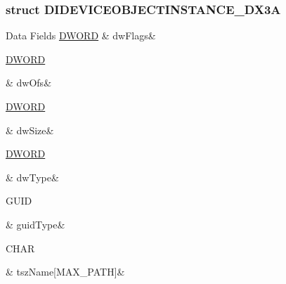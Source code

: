 \subsubsection{struct D\-I\-D\-E\-V\-I\-C\-E\-O\-B\-J\-E\-C\-T\-I\-N\-S\-T\-A\-N\-C\-E\-\_\-\-D\-X3\-A}
\begin{DoxyFields}{Data Fields}
\hypertarget{a00003_a4d2f405b1141000eb2af256e0fc8b98b}{\hyperlink{a00003_a50e15ae51c87ae06ab29c8148cb5f36c}{D\-W\-O\-R\-D}}\label{a00003_a4d2f405b1141000eb2af256e0fc8b98b}
&
dw\-Flags&
\\
\hline

\hypertarget{a00003_a2f0da10f0bff2a910138cc1b5715cdd5}{\hyperlink{a00003_a50e15ae51c87ae06ab29c8148cb5f36c}{D\-W\-O\-R\-D}}\label{a00003_a2f0da10f0bff2a910138cc1b5715cdd5}
&
dw\-Ofs&
\\
\hline

\hypertarget{a00003_a669c5a85f5a9eb97e64ad880fadaaa2d}{\hyperlink{a00003_a50e15ae51c87ae06ab29c8148cb5f36c}{D\-W\-O\-R\-D}}\label{a00003_a669c5a85f5a9eb97e64ad880fadaaa2d}
&
dw\-Size&
\\
\hline

\hypertarget{a00003_a81f5eff8d90c90eabc4c9a97d3ea7142}{\hyperlink{a00003_a50e15ae51c87ae06ab29c8148cb5f36c}{D\-W\-O\-R\-D}}\label{a00003_a81f5eff8d90c90eabc4c9a97d3ea7142}
&
dw\-Type&
\\
\hline

\hypertarget{a00003_aea5d3a608916b9ac856b773042e5051a}{G\-U\-I\-D}\label{a00003_aea5d3a608916b9ac856b773042e5051a}
&
guid\-Type&
\\
\hline

\hypertarget{a00003_a4b0a3dc31e4378c7de85eaa6654bcabb}{C\-H\-A\-R}\label{a00003_a4b0a3dc31e4378c7de85eaa6654bcabb}
&
tsz\-Name\mbox{[}M\-A\-X\-\_\-\-P\-A\-T\-H\mbox{]}&
\\
\hline

\end{DoxyFields}
\label{d1/d51/a00079}
\hypertarget{a00003_d1/d51/a00079}{}
